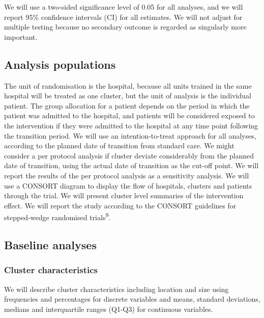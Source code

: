 \documentclass[
]{scrartcl}
\begin{document}
We will use a two-sided significance level of 0.05 for all analyses, and
we will report 95\% confidence intervals (CI) for all estimates. We will
not adjust for multiple testing because no secondary outcome is regarded
as singularly more important.

\hypertarget{analysis-populations}{%
\subsection{Analysis populations}\label{analysis-populations}}

The unit of randomisation is the hospital, because all units trained in
the same hospital will be treated as one cluster, but the unit of
analysis is the individual patient. The group allocation for a patient
depends on the period in which the patient was admitted to the hospital,
and patients will be considered exposed to the intervention if they were
admitted to the hospital at any time point following the transition
period. We will use an intention-to-treat approach for all analyses,
according to the planned date of transition from standard care. We might
consider a per protocol analysis if cluster deviate considerably from
the planned date of transition, using the actual date of transition as
the cut-off point. We will report the results of the per protocol
analysis as a sensitivity analysis. We will use a CONSORT diagram to
display the flow of hospitals, clusters and patients through the trial.
We will present cluster level summaries of the intervention effect. We
will report the study according to the CONSORT guidelines for
stepped-wedge randomised trials\textsuperscript{9}.

\hypertarget{baseline-analyses}{%
\subsection{Baseline analyses}\label{baseline-analyses}}

\hypertarget{cluster-characteristics}{%
\subsubsection{Cluster characteristics}\label{cluster-characteristics}}

We will describe cluster characteristics including location and size
using frequencies and percentages for discrete variables and means,
standard deviations, medians and interquartile ranges (Q1-Q3) for
continuous variables.
\end{document}
